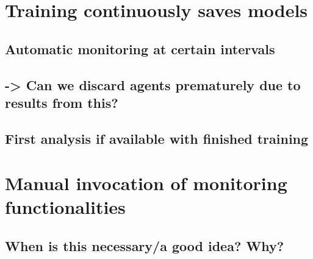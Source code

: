 \section{Training continuously saves models}
\subsection{Automatic monitoring at certain intervals}
\subsection{-> Can we discard agents prematurely due to results from this?}
\subsection{First analysis if available with finished training}

\section{Manual invocation of monitoring functionalities}
\subsection{When is this necessary/a good idea? Why?}